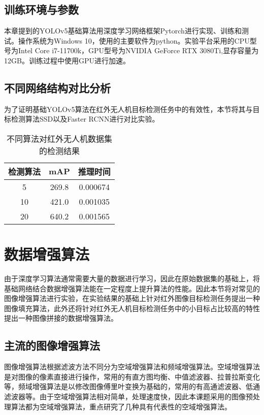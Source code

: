 \subsection{训练环境与参数}
本章提到的YOLOv5基础算法用深度学习网络框架Pytorch进行实现、训练和测试。操作系统为Windows 10，使用的主要软件为python。实验平台采用的CPU型号为Intel Core i7-11700k，GPU型号为NVIDIA GeForce RTX 3080Ti,显存容量为12GB。训练过程中使用GPU进行加速。

\subsection{不同网络结构对比分析}
为了证明基础YOLOv5算法在红外无人机目标检测任务中的有效性，本节将其与目标检测算法SSD以及Faster RCNN进行对比实验。

\begin{table}[htbp]
  \caption{不同算法对红外无人机数据集的检测结果}
  \vspace{0.5em}\centering\wuhao
  \begin{tabular}{ccc}
  \toprule
  检测算法 & mAP & 推理时间\\
  \midrule
   5 & 269.8 & 0.000674\\
  10 & 421.0 & 0.001035\\
  20 & 640.2 & 0.001565\\
  \bottomrule
  \end{tabular}
\end{table}

\section{数据增强算法}
由于深度学习算法通常需要大量的数据进行学习，因此在原始数据集的基础上，将基础网络结合数据增强算法能在一定程度上提升算法的性能。因此本节将对常见的图像增强算法进行实验，在实验结果的基础上针对红外图像目标检测任务提出一种图像填充算法，此外还将针对红外无人机目标检测任务中的小目标占比较高的特性提出一种图像拼接的数据增强算法。

\subsection{主流的图像增强算法}
图像增强算法根据滤波方法不同分为空域增强算法和频域增强算法。空域增强算法是对图像的像素直接进行操作，常用的有直方图均衡、中值滤波器、拉普拉斯变化等，频域增强算法是以修改图像傅里叶变换为基础的，常用的有高通滤波器、低通滤波器等。由于空域增强算法相对简单，处理速度快，因此本课题采用的图像预处理算法都为空域增强算法，重点研究了几种具有代表性的空域增强算法。

